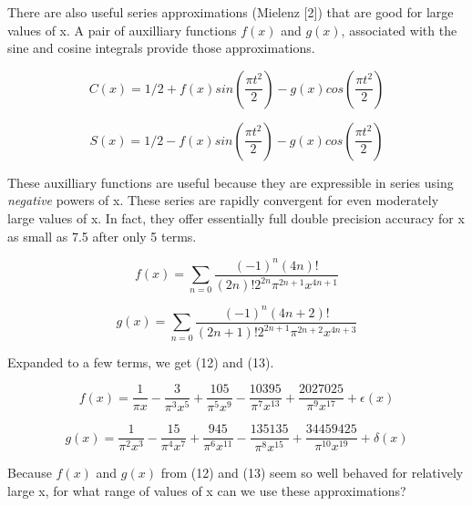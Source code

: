 \documentclass[a4paper,11pt]{article}
\begin{document}
There are also useful series approximations (Mielenz [2]) that are good for large values of x. A pair of auxilliary functions $f(x)$ and $g(x)$, associated with the sine and cosine integrals provide those approximations.

\begin{equation}
    C(x) = 1/2 + f(x) sin(\frac{\pi t^2}{2}) - g(x) cos(\frac{\pi t^2}{2})
\end{equation}

\begin{equation}
    S(x) = 1/2 - f(x) sin(\frac{\pi t^2}{2}) - g(x) cos(\frac{\pi t^2}{2})
\end{equation}

These auxilliary functions are useful because they are expressible in series using {\it negative} powers of x. These series are rapidly convergent for even moderately large values of x. In fact, they offer essentially full double precision accuracy for x as small as 7.5 after only 5 terms.

\begin{equation}
f(x) = \sum_{n=0} \frac{(-1)^n (4n)! } {(2n)! 2^{2n}  \pi^{2n+1} x^{4n+1}}
\end{equation}

\begin{equation}
g(x) = \sum_{n=0} \frac{(-1)^n (4n+2)! } {(2n+1)!  2^{2n+1}  \pi^{2n+2} x^{4n+3}}
\end{equation}

Expanded to a few terms, we get (12) and (13).

\begin{equation}
f(x) = \frac{1}{\pi x} - \frac{3}{\pi^3 x^5} + \frac{105}{\pi^5 x^9}  - \frac{10395}{\pi^7 x^{13}} + \frac{2027025}{\pi^9 x^{17}} + \epsilon(x)
\end{equation}

\begin{equation}
g(x) =  \frac{1}{\pi^2 x^3} - \frac{15}{\pi^4 x^7} + \frac{945}{\pi^6 x^{11}}  - \frac{135135}{\pi^8 x^{15}} + \frac{34459425}{\pi^{10} x^{19}} + \delta(x)
\end{equation}

Because $f(x)$ and $g(x)$ from (12) and (13) seem so well behaved for relatively large x, for what range of values of x can we use these approximations?
\end{document}
